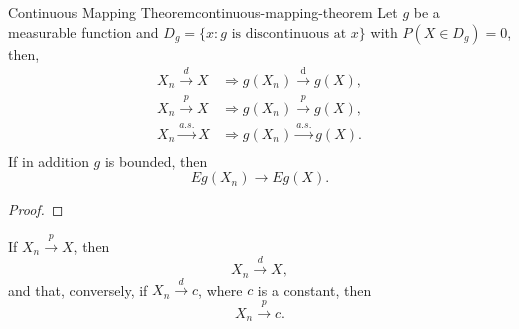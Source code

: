 \begin{theorem}{Continuous Mapping Theorem}{continuous-mapping-theorem}
    Let $g$ be a measurable function and $D_g=\{x:g \text{ is discontinuous at } x\}$ with $P(X\in D_g)=0$, then,
    \begin{equation}
        \begin{aligned}
            X_{n} \stackrel{d}{\rightarrow} X & \Rightarrow g\left(X_{n}\right) \stackrel{\mathrm{d}}{\rightarrow} g(X), \\
            X_{n} \stackrel{p}{\rightarrow} X & \Rightarrow g\left(X_{n}\right) \stackrel{p}{\rightarrow} g(X), \\
            X_{n} \stackrel{a.s.}{\rightarrow} X & \Rightarrow g\left(X_{n}\right) \stackrel{a.s.}{\rightarrow} g(X). \\
        \end{aligned}
    \end{equation}
    If in addition $g$ is bounded, then
    \begin{equation}
        Eg(X_n)\rightarrow Eg(X).
    \end{equation}
\end{theorem}

\begin{proof}
    
\end{proof}

\begin{theorem}{}{}
    If $X_{n}\stackrel{p}{\rightarrow}X$, then
    \begin{equation}
        X_{n}\stackrel{d}{\rightarrow}X,
    \end{equation}
    and that, conversely, if $X_{n}\stackrel{d}{\rightarrow}c$, where $c$ is a constant, then
    \begin{equation}
        X_{n}\stackrel{p}{\rightarrow}c.
    \end{equation}
\end{theorem}

